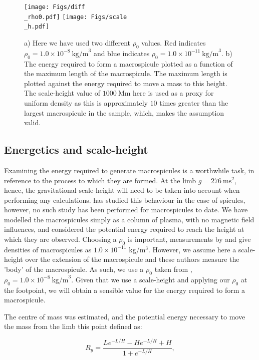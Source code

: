 \begin{figure}[h!]
	\centering
	\texttt{[image: Figs/diff\\\_rho0.pdf]}
	\texttt{[image: Figs/scale\\\_h.pdf]}
	\caption{\small a) Here we have used two different $\rho_0$ values. Red indicates $\rho_0 = 1.0 \times 10^{-8}\ \textrm{kg/m}^{3}$ and blue indicates $\rho_0 = 1.0 \times 10^{-11}\ \textrm{kg/m}^{3}$. b) The energy required to form a macrospicule plotted as a function of the maximum length of the macrospicule. The maximum length is plotted against the energy required to move a mass to this height. The scale-height value of $1000\ \textrm{Mm}$ here is used as a proxy for uniform density as this is approximately $10$ times greater than the largest macrospicule in the sample, which, makes the assumption valid.}
	\label{fig:scale_h}
\end{figure}

\subsection{Energetics and scale-height}
Examining the energy required to generate macrospicules is a worthwhile task, in reference to the process to which they are formed. At the limb $g = 276\ \textrm{ms}^2$, hence, the gravitational scale-height will need to be taken into account when performing any calculations. \cite{Pereira2012} has studied this behaviour in the case of spicules, however, no such study has been performed for macrospicules to date. We have modelled the macrospicules simply as a column of plasma, with no magnetic field influences, and considered the potential energy required to reach the height at which they are observed. Choosing a $\rho_0$ is important, measurements by \cite{Parenti2002} and \cite{Withbroe1976} give densities of macrospicules as $1.0 \times 10^{-11}$ kg/m$^{3}$. However, we assume here a scale-height over the extension of the macrospicule and these authors measure the 'body' of the macrospicule. As such, we use a $\rho_0$ taken from \cite{Vernazza1981}, $\rho_0 = 1.0 \times 10^{-8}\ \textrm{kg/m}^{3}$. Given that we use a scale-height and applying our $\rho_0$ at the footpoint, we will obtain a sensible value for the energy required to form a macrospicule.

The centre of mass was estimated, and the potential energy necessary to move the mass from the limb this point defined as:

\begin{equation}
R_y = \frac{Le^{-L/H} - He^{-L/H} + H}{1 + e^{-L/H}},
\end{equation} 

